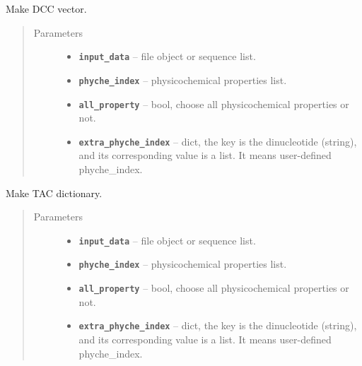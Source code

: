 \documentclass[letterpaper,10pt,english]{sphinxmanual}
\begin{document}

\begin{fulllineitems}
\label{reference/PyDNAac:PyDNAac.GetDCC}
Make DCC vector.
\begin{quote}\begin{description}
\item[{Parameters}] \leavevmode\begin{itemize}
\item {} 
\textbf{\texttt{input\_data}} -- file object or sequence list.

\item {} 
\textbf{\texttt{phyche\_index}} -- physicochemical properties list.

\item {} 
\textbf{\texttt{all\_property}} -- bool, choose all physicochemical properties or not.

\item {} 
\textbf{\texttt{extra\_phyche\_index}} -- dict, the key is the dinucleotide (string), and its corresponding value is a list.
It means user-defined phyche\_index.

\end{itemize}

\end{description}\end{quote}

\end{fulllineitems}


\begin{fulllineitems}
\label{reference/PyDNAac:PyDNAac.GetTAC}
Make TAC dictionary.
\begin{quote}\begin{description}
\item[{Parameters}] \leavevmode\begin{itemize}
\item {} 
\textbf{\texttt{input\_data}} -- file object or sequence list.

\item {} 
\textbf{\texttt{phyche\_index}} -- physicochemical properties list.

\item {} 
\textbf{\texttt{all\_property}} -- bool, choose all physicochemical properties or not.

\item {} 
\textbf{\texttt{extra\_phyche\_index}} -- dict, the key is the dinucleotide (string), and its corresponding value is a list.
It means user-defined phyche\_index.

\end{itemize}

\end{description}\end{quote}

\end{fulllineitems}
\end{document}
